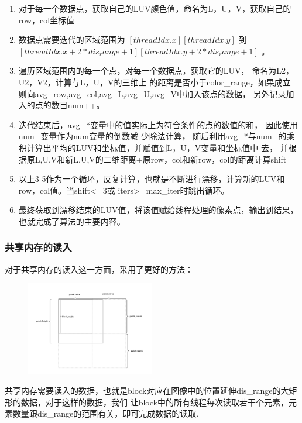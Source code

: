 \documentclass[a4paper, 11pt]{article}
\begin{document}
\begin{enumerate}
    \item 对于每一个数据点，获取自己的LUV颜色值，命名为L，U，V，获取自己的row，col坐标值
    \item 数据点需要迭代的区域范围为 $[threadIdx.x][threadIdx.y]$ 到 $[threadIdx.x+2*dis_range+1] [threadIdx.y+2*dis_range+1]$ 。
    \item 遍历区域范围内的每一个点，对每一个数据点，获取它的LUV，
    命名为L2，U2，V2，计算与L，U，V的三维上
    的距离是否小于color\_range，如果成立
    则向avg\_row,avg\_col,avg\_L,avg\_U,avg\_V中加入该点的数据，
    另外记录加入的点的数目num++。
    \item 迭代结束后，avg\_*变量中的值实际上为符合条件的点的数值的和，
    因此使用num\_变量作为num变量的倒数减 少除法计算，
    随后利用avg\_*与num\_的乘积计算出平均的LUV和坐标值，并赋值到L，U，V变量和坐标值中 去，
    并根据原L,U,V和新L,U,V的二维距离+原row，col和新row，col的距离计算shift
    \item 以上3-5作为一个循环，反复计算，也就是不断进行漂移，计算新的LUV和row，col值。当shift<=3或 iters>=max\_iter时跳出循环。
    \item 最终获取到漂移结束的LUV值，将该值赋给线程处理的像素点，输出到结果，也就完成了算法的主要内容。
\end{enumerate}

\subsubsection{共享内存的读入}
对于共享内存的读入这一方面，采用了更好的方法：


\begin{figure}[H]    
    \centering
    \includegraphics[width=0.5\textwidth]{images/patch.png}
\end{figure}

共享内存需要读入的数据，也就是block对应在图像中的位置延伸dis\_range的大矩形的数据，对于这样的数据，我们
让block中的所有线程每次读取若干个元素，元素数量跟dis\_range的范围有关，即可完成数据的读取.
\end{document}
